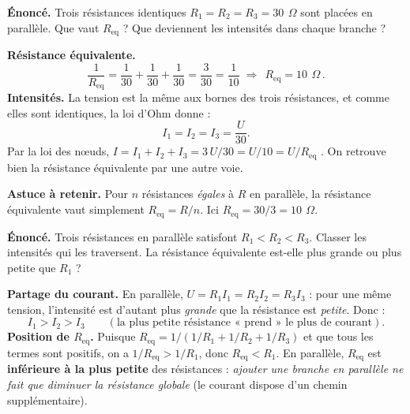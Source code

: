 \documentclass[11pt,a4paper]{article}
\newcommand{\ohm}{\,\Omega}
\newcommand{\Req}{R_{\mathrm{eq}}}
\begin{document}
\begin{exemple}
\textbf{Énoncé.} Trois résistances identiques $R_1=R_2=R_3=\SI{30}{\ohm}$ sont placées en parallèle.
Que vaut $\Req$ ? Que deviennent les intensités dans chaque branche ?

\smallskip
\textbf{Résistance équivalente.}
\[ \frac{1}{R_{\mathrm{eq}}} = \frac{1}{30}+\frac{1}{30}+\frac{1}{30} = \frac{3}{30}=\frac{1}{10}
   \;\Longrightarrow\; \boxed{\,R_{\mathrm{eq}}=\SI{10}{\ohm}\,}. \]
\textbf{Intensités.} La tension est la même aux bornes des trois résistances, et comme elles sont
identiques, la loi d'Ohm donne :
\[ I_1 = I_2 = I_3 = \frac{U}{30}. \]
Par la loi des nœuds, $I=I_1+I_2+I_3 = 3\,U/30 = U/10 = U/R_{\mathrm{eq}}$ \checkmark. On retrouve
bien la résistance équivalente par une autre voie.

\textbf{Astuce à retenir.} Pour $n$ résistances \emph{égales} à $R$ en parallèle, la résistance
équivalente vaut simplement $\Req = R/n$. Ici $\Req=30/3=\SI{10}{\ohm}$.
\end{exemple}

\begin{exemple}
\textbf{Énoncé.} Trois résistances en parallèle satisfont $R_1<R_2<R_3$. Classer les intensités qui les
traversent. La résistance équivalente est-elle plus grande ou plus petite que $R_1$ ?

\smallskip
\textbf{Partage du courant.} En parallèle, $U=R_1 I_1=R_2 I_2=R_3 I_3$ : pour une même tension,
l'intensité est d'autant plus \emph{grande} que la résistance est \emph{petite}. Donc :
\[ I_1 > I_2 > I_3 \qquad (\text{la plus petite résistance « prend » le plus de courant}). \]
\textbf{Position de $\Req$.} Puisque $\Req=1/(1/R_1+1/R_2+1/R_3)$ et que tous les termes sont
positifs, on a $1/\Req > 1/R_1$, donc $\Req < R_1$. En parallèle, $\Req$ est \textbf{inférieure à la
plus petite} des résistances : \emph{ajouter une branche en parallèle ne fait que diminuer la
résistance globale} (le courant dispose d'un chemin supplémentaire).
\end{exemple}
\end{document}
